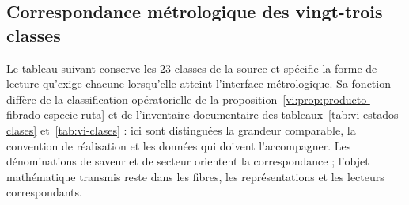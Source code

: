 \subsection{Correspondance métrologique des vingt-trois classes
}
\label{subsec:vi-clases-metrologia}

Le tableau suivant conserve les \(23\) classes de la source et spécifie la
forme de lecture qu’exige chacune lorsqu’elle atteint l’interface métrologique. Sa
fonction diffère de la classification opératorielle de la
proposition~\ref{vi:prop:producto-fibrado-especie-ruta} et de l’inventaire
documentaire des tableaux~\ref{tab:vi-estados-clases} et~\ref{tab:vi-clases} :
ici sont distinguées la grandeur comparable, la convention de réalisation et
les données qui doivent l’accompagner. Les dénominations de saveur et de secteur
orientent la correspondance ; l’objet mathématique transmis reste dans
les fibres, les représentations et les lecteurs correspondants.


